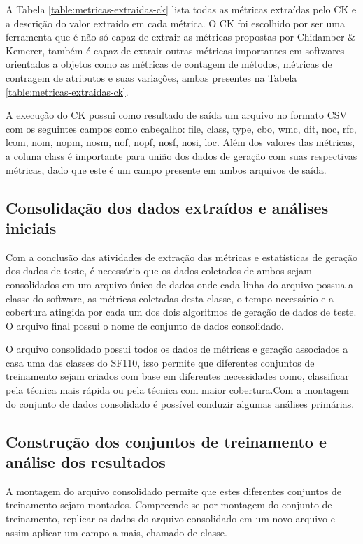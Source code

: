 \documentclass[
	12pt,				%
	oneside,			%
	a4paper,			%
	english,			%
	brazil				%
	]{abntex2ppgsi}
\begin{document}
A Tabela \ref{table:metricas-extraidas-ck} lista todas as métricas extraídas pelo CK e a descrição do valor extraído em cada métrica. O CK  foi escolhido por ser uma ferramenta que é não só capaz de extrair as métricas propostas por Chidamber \& Kemerer, também é capaz de extrair outras métricas importantes em softwares orientados a objetos como as métricas de contagem de métodos, métricas de contragem de atributos e suas variações, ambas presentes na Tabela \ref{table:metricas-extraidas-ck}.

A execução do CK possui como resultado de saída um arquivo no formato CSV com os seguintes campos como cabeçalho: file, class, type, cbo, wmc, dit, noc, rfc, lcom, nom, nopm, nosm, nof, nopf, nosf, nosi, loc. Além dos valores das métricas, a coluna class é importante para união dos dados de geração com suas respectivas métricas, dado que este é um campo presente em ambos arquivos de saída.

\subsection{Consolidação dos dados extraídos e análises iniciais}
Com a conclusão das atividades de extração das métricas e estatísticas de geração dos dados de teste, é necessário que os dados coletados de ambos sejam consolidados em um arquivo único de dados onde cada linha do arquivo possua a classe do software, as métricas coletadas desta classe, o tempo necessário e a cobertura atingida por cada um dos dois algoritmos de geração de dados de teste. O arquivo final possui o nome de conjunto de dados consolidado.

O arquivo consolidado possui todos os dados de métricas e geração associados a casa  uma das classes do SF110, isso permite que diferentes conjuntos de treinamento sejam criados com base em diferentes necessidades como, classificar pela técnica mais rápida ou pela técnica com maior cobertura.Com a montagem do conjunto de dados consolidado é possível conduzir algumas análises primárias. 


\subsection{Construção dos conjuntos de treinamento e análise dos resultados}

A montagem do arquivo consolidado permite que estes diferentes conjuntos de treinamento sejam montados. Compreende-se por montagem do conjunto de treinamento, replicar os dados do arquivo consolidado em um novo arquivo e assim aplicar um campo a mais, chamado de classe.  
\end{document}
